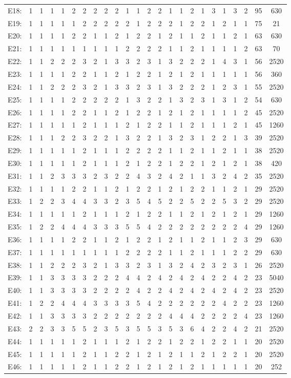 \documentclass[12pt]{article}
\begin{document}
\begin{center}
\begin{tabular}{cccccccccccccccccccccc|c|c}
E18:&1&1&1&1&2&2&2&2&2&1&1&2&2&1&1&2&1&3&1&3&2&95&630\\
E19:&1&1&1&1&1&2&2&2&2&2&1&2&2&2&1&2&2&1&2&1&1&75&21\\
E20:&1&1&1&1&2&2&1&1&2&1&2&2&1&2&1&1&2&1&1&2&1&63&630\\
E21:&1&1&1&1&1&1&1&1&1&2&2&2&2&1&1&2&1&1&1&1&2&63&70\\
E22:&1&1&2&2&2&3&2&1&3&3&2&3&1&3&2&2&2&1&4&3&1&56&2520\\
E23:&1&1&1&1&2&2&1&1&2&1&2&2&1&2&1&2&1&1&1&1&1&56&360\\
E24:&1&1&2&2&2&3&2&1&3&3&2&3&1&3&2&2&2&1&2&3&1&55&2520\\
E25:&1&1&1&1&2&2&2&2&2&1&3&2&2&1&3&2&3&1&3&1&2&54&630\\
E26:&1&1&1&1&2&2&1&1&2&1&2&2&1&2&1&2&1&1&1&1&2&45&2520\\
E27:&1&1&1&1&1&2&1&1&1&2&1&2&2&1&1&2&1&1&1&2&1&45&1260\\
E28:&1&1&1&2&2&3&2&2&1&3&2&2&1&3&2&3&1&2&2&1&3&39&2520\\
E29:&1&1&1&1&1&2&1&1&1&2&2&2&2&1&1&2&1&1&2&1&1&38&2520\\
E30:&1&1&1&1&1&2&1&1&1&2&1&2&2&1&2&2&1&2&1&2&1&38&420\\
E31:&1&1&2&3&3&3&2&3&2&2&4&3&2&4&2&1&1&3&2&4&2&35&2520\\
E32:&1&1&1&1&2&2&1&1&2&1&2&2&1&2&1&2&2&1&1&2&1&29&2520\\
E33:&1&2&2&3&4&4&3&3&2&3&5&4&5&2&2&5&2&2&5&3&2&29&2520\\
E34:&1&1&1&1&1&2&1&1&1&2&1&2&2&1&1&2&1&2&1&2&1&29&1260\\
E35:&1&2&2&4&4&4&3&3&3&5&5&4&2&2&2&2&2&2&2&2&4&29&1260\\
E36:&1&1&1&1&2&2&1&1&2&1&2&2&1&2&1&1&2&1&1&2&3&29&630\\
E37:&1&1&1&1&1&1&1&1&1&2&2&2&2&1&1&2&1&1&1&2&2&29&630\\
E38:&1&1&2&2&2&3&2&1&3&3&2&3&1&3&2&4&2&3&2&3&1&26&2520\\
E39:&1&1&3&3&3&3&2&2&2&4&4&2&4&2&4&2&4&2&2&4&2&23&5040\\
E40:&1&1&3&3&3&3&2&2&2&2&4&2&2&4&2&4&2&4&2&4&2&23&2520\\
E41:&1&2&2&4&4&4&3&3&3&3&5&4&2&2&2&2&2&2&4&2&2&23&1260\\
E42:&1&1&3&3&3&3&2&2&2&2&2&2&2&4&4&4&2&2&2&2&4&23&1260\\
E43:&2&2&3&3&5&5&2&3&5&3&5&5&3&5&3&6&4&2&2&4&2&21&2520\\
E44:&1&1&1&1&1&2&1&1&1&2&1&2&2&1&2&2&1&2&2&1&1&20&2520\\
E45:&1&1&1&1&1&2&1&1&2&2&1&2&1&2&1&1&2&1&2&2&1&20&2520\\
E46:&1&1&1&1&1&2&1&1&2&2&1&2&1&2&1&2&1&1&1&1&1&20&252\\
\end{tabular}
\end{center}
\end{document}
